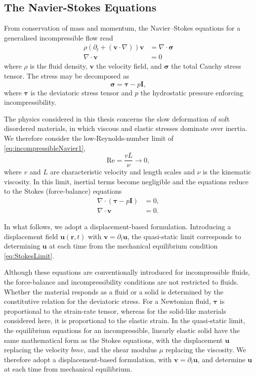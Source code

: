 \subsection{The Navier-Stokes Equations}
From conservation of mass and momentum, the Navier--Stokes equations for a generalised incompressible flow read
\begin{subequations}
\label{eq:NavierStokes}
\begin{align}
    \rho \left(\partial_t+(\bm{v} \cdot \nabla)\right)\bm{v} &= \nabla \cdot \bm{\sigma} \label{eq:incompressibleNavier1} \\
    \nabla\cdot\bm{v} &= 0 \label{eq:incompressibleNavier2}
\end{align}
\end{subequations}
where $\rho$ is the fluid density, $\bm{v}$ the velocity field, and $\bm{\sigma}$ the total Cauchy stress tensor. The stress may be decomposed as
\begin{equation*}
    \bm{\sigma} = \bm{\tau} - p\bm{I},
\end{equation*}
where $\bm{\tau}$ is the deviatoric stress tensor and $p$ the hydrostatic pressure enforcing incompressibility.

The physics considered in this thesis concerns the slow deformation of soft disordered materials, in which viscous and elastic stresses dominate over inertia. We therefore consider the low-Reynolds-number limit of \cref{eq:incompressibleNavier1},
\[
    \text{Re} = \frac{v L}{\nu} \to 0,
\]
where $v$ and $L$ are characteristic velocity and length scales and $\nu$ is the kinematic viscosity. In this limit, inertial terms become negligible and the equations reduce to the Stokes (force-balance) equations
\begin{subequations}
\label{eq:StokesLimit}
\begin{align}
    \nabla \cdot (\bm{\tau} - p\bm{I}) &= 0, \\
    \nabla \cdot \bm{v} &= 0.
\end{align}
\end{subequations}

In what follows, we adopt a displacement-based formulation. Introducing a displacement field $\bm{u}(\bm{r},t)$ with $\bm{v}=\partial_t\bm{u}$, the quasi-static limit corresponds to determining $\bm{u}$ at each time from the mechanical equilibrium condition \cref{eq:StokesLimit}.

Although these equations are conventionally introduced for incompressible fluids, the force-balance and incompressibility conditions are not restricted to fluids. Whether the material responds as a fluid or a solid is determined by the constitutive relation for the deviatoric stress. For a Newtonian fluid, $\bm{\tau}$ is proportional to the strain-rate tensor, whereas for the solid-like materials considered here, it is proportional to the elastic strain. In the quasi-static limit, the equilibrium equations for an incompressible, linearly elastic solid have the same mathematical form as the Stokes equations, with the displacement $\bm{u}$ replacing the velocity $bm{v}$, and the shear modulus $\mu$ replacing the viscosity. We therefore adopt a displacement-based formulation, with $\bm{v}=\partial_t\bm{u}$, and determine $\bm{u}$ at each time from mechanical equilibrium.

